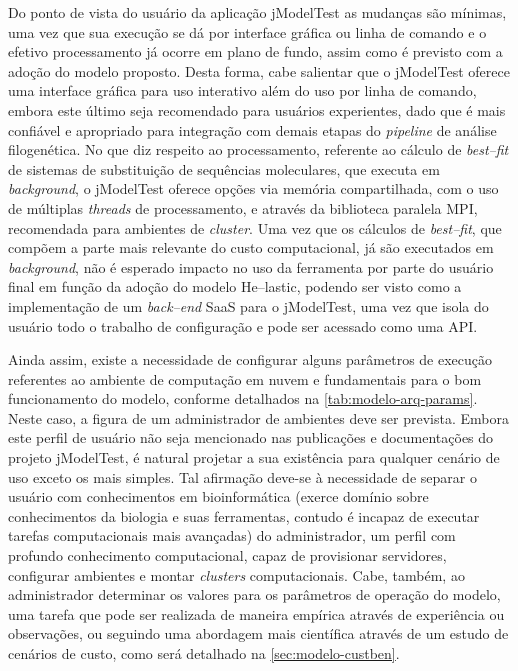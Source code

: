 \documentclass[english,brazilian]{UNISINOSmonografia} %
\begin{document}
Do ponto de vista do usuário da aplicação jModelTest as mudanças são mínimas, uma vez que sua execução se dá por interface gráfica ou linha de comando e o efetivo processamento já ocorre em plano de fundo, assim como é previsto com a adoção do modelo proposto.
Desta forma, cabe salientar que o jModelTest oferece uma interface gráfica para uso interativo além do uso por linha de comando, embora este último seja recomendado para usuários experientes, dado que é mais confiável e apropriado para integração com demais etapas do \textit{pipeline} de análise filogenética.
No que diz respeito ao processamento, referente ao cálculo de \textit{best--fit} de sistemas de substituição de sequências moleculares, que executa em \textit{background}, o jModelTest oferece opções via memória compartilhada, com o uso de múltiplas \textit{threads} de processamento, e através da biblioteca paralela MPI, recomendada para ambientes de \textit{cluster}.
Uma vez que os cálculos de \textit{best--fit}, que compõem a parte mais relevante do custo computacional, já são executados em \textit{background}, não é esperado impacto no uso da ferramenta por parte do usuário final em função da adoção do modelo \textsf{He}--lastic, podendo ser visto como a implementação de um \textit{back--end} SaaS para o jModelTest, uma vez que isola do usuário todo o trabalho de configuração e pode ser acessado como uma API.



Ainda assim, existe a necessidade de configurar alguns parâmetros de execução referentes ao ambiente de computação em nuvem e fundamentais para o bom funcionamento do modelo, conforme detalhados na \autoref{tab:modelo-arq-params}.
Neste caso, a figura de um administrador de ambientes deve ser prevista.
Embora este perfil de usuário não seja mencionado nas publicações e documentações do projeto jModelTest, é natural projetar a sua existência para qualquer cenário de uso exceto os mais simples.
Tal afirmação deve-se à necessidade de separar o usuário com conhecimentos em bioinformática (exerce domínio sobre conhecimentos da biologia e suas ferramentas, contudo é incapaz de executar tarefas computacionais mais avançadas) do administrador, um perfil com profundo conhecimento computacional, capaz de provisionar servidores, configurar ambientes e montar \textit{clusters} computacionais.
%
Cabe, também, ao administrador determinar os valores para os parâmetros de operação do modelo, uma tarefa que pode ser realizada de maneira empírica através de experiência ou observações, ou seguindo uma abordagem mais científica através de um estudo de cenários de custo, como será detalhado na \autoref{sec:modelo-custben}.
\end{document}
